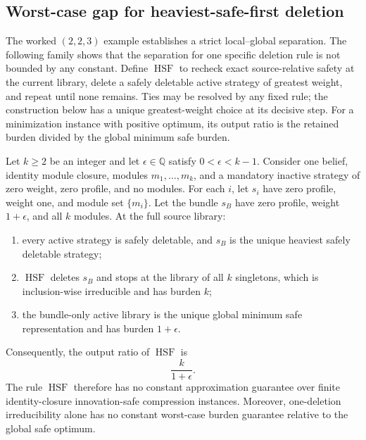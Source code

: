 \subsection{Worst-case gap for heaviest-safe-first deletion}
\label{sec:aor-safe-deletion-gap}

The worked \((2,2,3)\) example establishes a strict local--global
separation.  The following family shows that the separation for one specific
deletion rule is not bounded by any constant.  Define
\(\operatorname{HSF}\) to recheck exact source-relative safety at the current
library, delete a safely deletable active strategy of greatest weight, and
repeat until none remains.  Ties may be resolved by any fixed rule; the
construction below has a unique greatest-weight choice at its decisive step.
For a minimization instance with positive optimum, its output ratio is the
retained burden divided by the global minimum safe burden.

\begin{theorem}
\label{thm:aor-heaviest-safe-first-gap}
Let \(k\geq2\) be an integer and let
\(\epsilon\in\mathbb Q\) satisfy \(0<\epsilon<k-1\).  Consider one belief,
identity module closure, modules \(m_1,\ldots,m_k\), and a mandatory inactive
strategy of zero weight, zero profile, and no modules.  For each \(i\), let
\(s_i\) have zero profile, weight one, and module set \(\{m_i\}\).  Let the
bundle \(s_B\) have zero profile, weight \(1+\epsilon\), and all \(k\)
modules.  At the full source library:
\begin{enumerate}
\item every active strategy is safely deletable, and \(s_B\) is the unique
  heaviest safely deletable strategy;
\item \(\operatorname{HSF}\) deletes \(s_B\) and stops at the library of all
  \(k\) singletons, which is inclusion-wise irreducible and has burden \(k\);
\item the bundle-only active library is the unique global minimum safe
  representation and has burden \(1+\epsilon\).
\end{enumerate}
Consequently, the output ratio of \(\operatorname{HSF}\) is
\[
 \frac{k}{1+\epsilon}.
\]
The rule \(\operatorname{HSF}\) therefore has no constant approximation
guarantee over finite identity-closure innovation-safe compression instances.
Moreover, one-deletion irreducibility alone has no constant worst-case burden
guarantee relative to the global safe optimum.
\end{theorem}

